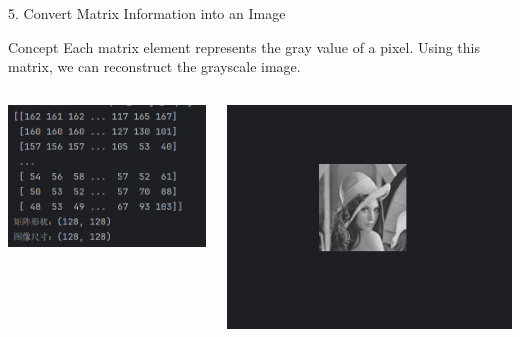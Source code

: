 \documentclass{beamer}
\begin{document}
\begin{frame}{5. Convert Matrix Information into an Image}
    \begin{block}{Concept}
        Each matrix element represents the gray value of a pixel. Using this matrix, we can reconstruct the grayscale image.
    \end{block}

    \vspace{0.3cm}
    \begin{columns}
        \centering
        \includegraphics[width=\linewidth]{fig/matrix_information.png}

        \centering
        \includegraphics[width=\linewidth]{fig/The_corresponding_image.png}
    \end{columns}
\end{frame}
\end{document}
